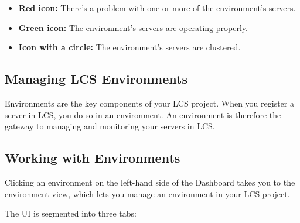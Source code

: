 \begin{itemize}
\tightlist
\item
  \textbf{Red icon:} There's a problem with one or more of the
  environment's servers.
\item
  \textbf{Green icon:} The environment's servers are operating properly.
\item
  \textbf{Icon with a circle:} The environment's servers are clustered.
\end{itemize}

\subsection{Managing LCS
Environments}\label{managing-lcs-environments}

Environments are the key components of your LCS project. When you
register a server in LCS, you do so in an environment. An environment is
therefore the gateway to managing and monitoring your servers in LCS.

\subsection{Working with Environments}\label{working-with-environments}

Clicking an environment on the left-hand side of the Dashboard takes you
to the environment view, which lets you manage an environment in your
LCS project.

The UI is segmented into three tabs:


